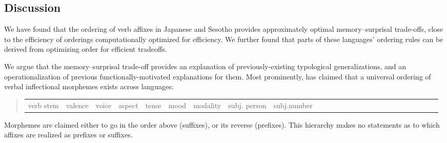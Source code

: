 









\subsection{Discussion}
We have found that the ordering of verb affixes in Japanese and Sesotho provides approximately optimal memory--surprisal trade-offs, close to the efficiency of orderings computationally optimized for efficiency.
We further found that parts of these languages' ordering rules can be derived from optimizing order for efficient tradeoffs.

We argue that the memory--surprisal trade-off provides an explanation of previously-existing typological generalizations, and an operationalization of previous functionally-motivated explanations for them.
Most prominently, \citet{bybee-morphology-1985} has claimed that a universal ordering of verbal inflectional morphemes exists across languages:
\begin{quote}
\begin{tabular}{llllllllllllllllllllllllll}
verb stem & valence & voice & aspect & tense& mood & modality & subj. person & subj.number 
\end{tabular}
\end{quote}
Morphemes are claimed either to go in the order above (suffixes), or its reverse (prefixes). This hierarchy makes no statements as to which affixes are realized as prefixes or suffixes.

